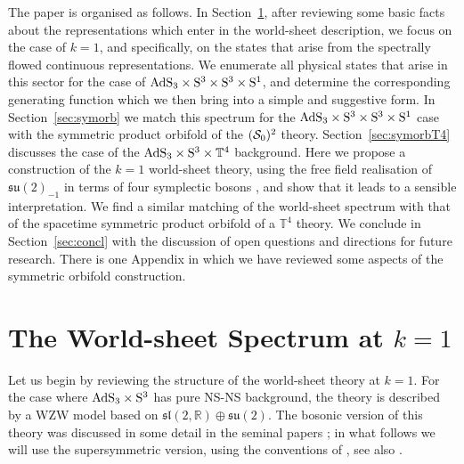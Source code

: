 \documentclass[12pt,a4paper]{article}
\begin{document}
\medskip


The paper is organised as follows. In Section~\ref{sec:worldsheet}, after reviewing some basic facts about the representations which enter in the world-sheet description, we focus on the case of $k=1$, and specifically, on the states that arise from the spectrally flowed continuous representations. We enumerate all physical states that arise in this sector for the case of ${\rm AdS}_3\times {\rm S}^3 \times {\rm S}^3 \times {\rm S}^1$, and determine the corresponding generating function which we then bring into a simple and suggestive form. 
In Section~\ref{sec:symorb} we match this spectrum for the ${\rm AdS}_3\times {\rm S}^3 \times {\rm S}^3 \times {\rm S}^1$ case with the symmetric product orbifold of the $({\cal S}_0)^2$ theory. Section~\ref{sec:symorbT4} discusses the case of the ${\rm AdS}_3 \times {\rm S}^3 \times \mathbb{T}^4$ background. Here we propose a construction of the $k=1$ world-sheet theory, using the free field realisation of $\mathfrak{su}(2)_{-1}$ in terms of four symplectic bosons \cite{Goddard:1987td}, and show that it leads to a sensible interpretation. We find a similar matching of the world-sheet spectrum with that of the spacetime symmetric product orbifold of a $\mathbb{T}^4$ theory. We conclude in Section~\ref{sec:concl} with the discussion of open questions and directions for future research. There is one Appendix in which we have reviewed some aspects of the symmetric orbifold construction. 



\section{The World-sheet Spectrum at $k=1$}\label{sec:worldsheet}


Let us begin by reviewing the structure of the world-sheet theory at $k=1$. For the case where ${\rm AdS}_3\times {\rm S}^3$ has pure NS-NS background, the theory is described by a WZW model based on $\mathfrak{sl}(2,\mathbb{R})\oplus \mathfrak{su}(2)$. The bosonic version of this theory was discussed in some detail in the seminal papers \cite{Maldacena:2000hw,Maldacena:2000kv,Maldacena:2001km}; in what follows we will use the supersymmetric version, using the conventions of \cite{Ferreira:2017pgt}, see also \cite{Giveon:1998ns,Israel:2003ry,Raju:2007uj}.
\end{document}
